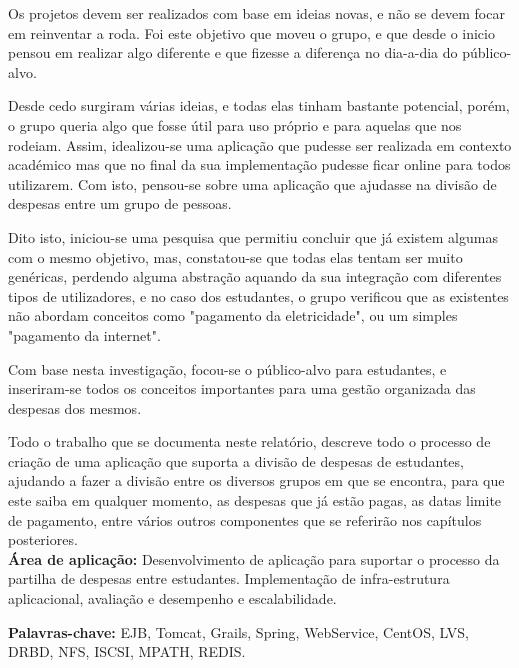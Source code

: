 \begin{resumo}

Os projetos devem ser realizados com base em ideias novas, e não se devem focar em reinventar a roda. Foi este objetivo que moveu o grupo, e que desde o inicio pensou em realizar algo diferente e que fizesse a diferença no dia-a-dia do público-alvo.

Desde cedo surgiram várias ideias, e todas elas tinham bastante potencial, porém, o grupo queria algo que fosse útil para uso próprio e para aquelas que nos rodeiam. Assim, idealizou-se uma aplicação que pudesse ser realizada em contexto académico mas que no final da sua implementação pudesse ficar online para todos utilizarem. Com isto, pensou-se sobre uma aplicação que ajudasse na divisão de despesas entre um grupo de pessoas.

Dito isto, iniciou-se uma pesquisa que permitiu concluir que já existem algumas com o mesmo objetivo, mas, constatou-se que todas elas tentam ser muito genéricas, perdendo alguma abstração aquando da sua integração com diferentes tipos de utilizadores, e no caso dos estudantes, o grupo verificou que as existentes não abordam conceitos como "pagamento da eletricidade", ou um simples "pagamento da internet".

Com base nesta investigação, focou-se o público-alvo para estudantes, e inseriram-se todos os conceitos importantes para uma gestão organizada das despesas dos mesmos.

Todo o trabalho que se documenta neste relatório, descreve todo o processo de criação de uma aplicação que suporta a divisão de despesas de estudantes, ajudando a fazer a divisão entre os diversos grupos em que se encontra, para que este saiba em qualquer momento, as despesas que já estão pagas, as datas limite de pagamento, entre vários outros componentes que se referirão nos capítulos posteriores. \\

\textbf{Área de aplicação:} Desenvolvimento de aplicação para suportar o processo da partilha de despesas entre estudantes. Implementação de infra-estrutura aplicacional, avaliação e desempenho e escalabilidade.

\textbf{Palavras-chave:} EJB, Tomcat, Grails, Spring, WebService, CentOS, LVS, DRBD, NFS, ISCSI, MPATH, REDIS.

\end{resumo}